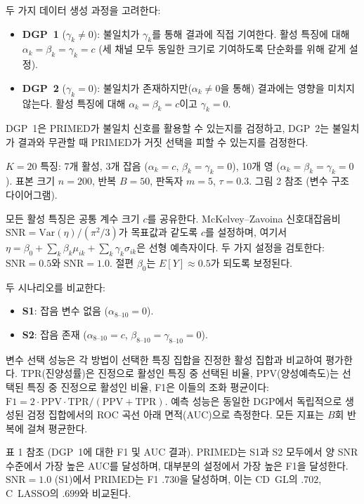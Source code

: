 \documentclass[a4paper,11pt]{article}
\begin{document}
두 가지 데이터 생성 과정을 고려한다:
\begin{itemize}
  \item \textbf{DGP~1} ($\gamma_k \neq 0$): 불일치가 $\gamma_k$를 통해 결과에 직접 기여한다.
    활성 특징에 대해 $\alpha_k = \beta_k = \gamma_k = c$ (세 채널 모두 동일한 크기로 기여하도록 단순화를 위해 같게 설정).
  \item \textbf{DGP~2} ($\gamma_k = 0$): 불일치가 존재하지만($\alpha_k \neq 0$을 통해) 결과에는 영향을 미치지 않는다.
    활성 특징에 대해 $\alpha_k = \beta_k = c$이고 $\gamma_k = 0$.
\end{itemize}
DGP~1은 PRIMED가 불일치 신호를 활용할 수 있는지를 검정하고, DGP~2는 불일치가 결과와 무관할 때 PRIMED가 거짓 선택을 피할 수 있는지를 검정한다.

$K = 20$ 특징: 7개 활성, 3개 잡음 ($\alpha_k = c$, $\beta_k = \gamma_k = 0$), 10개 영 ($\alpha_k = \beta_k = \gamma_k = 0$).
표본 크기 $n = 200$, 반복 $B = 50$, 판독자 $m = 5$, $\tau = 0.3$.
그림 2 참조 (변수 구조 다이어그램).

모든 활성 특징은 공통 계수 크기 $c$를 공유한다.
McKelvey--Zavoina 신호대잡음비 $\mathrm{SNR} = \mathrm{Var}(\eta) / (\pi^2/3)$가 목표값과 같도록 $c$를 설정하며, 여기서 $\eta = \beta_0 + \sum_k \beta_k \mu_{ik} + \sum_k \gamma_k \sigma_{ik}$은 선형 예측자이다.
두 가지 설정을 검토한다: $\mathrm{SNR} = 0.5$와 $\mathrm{SNR} = 1.0$.
절편 $\beta_0$는 $E[Y] \approx 0.5$가 되도록 보정된다.

두 시나리오를 비교한다:
\begin{itemize}
  \item \textbf{S1}: 잡음 변수 없음 ($\alpha_{8\text{--}10} = 0$).
  \item \textbf{S2}: 잡음 존재 ($\alpha_{8\text{--}10} = c$, $\beta_{8\text{--}10} = \gamma_{8\text{--}10} = 0$).
\end{itemize}

변수 선택 성능은 각 방법이 선택한 특징 집합을 진정한 활성 집합과 비교하여 평가한다.
TPR(진양성률)은 진정으로 활성인 특징 중 선택된 비율, PPV(양성예측도)는 선택된 특징 중 진정으로 활성인 비율, F1은 이들의 조화 평균이다: $\mathrm{F1} = 2 \cdot \mathrm{PPV} \cdot \mathrm{TPR} / (\mathrm{PPV} + \mathrm{TPR})$.
예측 성능은 동일한 DGP에서 독립적으로 생성된 검정 집합에서의 ROC 곡선 아래 면적(AUC)으로 측정한다.
모든 지표는 $B$회 반복에 걸쳐 평균한다.

표 1 참조 (DGP~1에 대한 F1 및 AUC 결과).
PRIMED는 S1과 S2 모두에서 양 SNR 수준에서 가장 높은 AUC를 달성하며, 대부분의 설정에서 가장 높은 F1을 달성한다.
$\mathrm{SNR} = 1.0$ (S1)에서 PRIMED는 F1 $.730$을 달성하며, 이는 CD~GL의 $.702$, C~LASSO의 $.699$와 비교된다.
\end{document}
